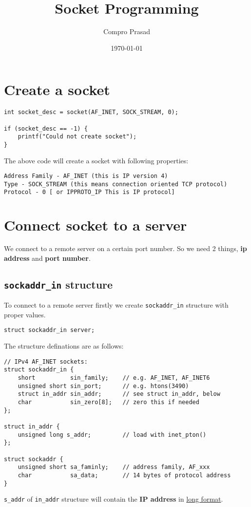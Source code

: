 \documentclass[11pt]{article}
\author{Compro Prasad}
\date{\today}
\title{Socket Programming}
\begin{document}
\maketitle
\tableofcontents

\section{Create a socket}
\label{sec:orgheadline1}
\begin{verbatim}
int socket_desc = socket(AF_INET, SOCK_STREAM, 0);

if (socket_desc == -1) {
	printf("Could not create socket");
}
\end{verbatim}
The above code will create a socket with following properties:
\begin{verbatim}
Address Family - AF_INET (this is IP version 4)
Type - SOCK_STREAM (this means connection oriented TCP protocol)
Protocol - 0 [ or IPPROTO_IP This is IP protocol]
\end{verbatim}
\section{Connect socket to a server}
\label{sec:orgheadline6}
We connect to a remote server on a certain port number. So we need
2 things, \textbf{ip address} and \textbf{port number}.
\subsection{\texttt{sockaddr\_in} structure}
\label{sec:orgheadline2}
To connect to a remote server firstly we create \texttt{sockaddr\_in}
structure with proper values.
\begin{verbatim}
struct sockaddr_in server;
\end{verbatim}
The structure definations are as follows:
\begin{verbatim}
// IPv4 AF_INET sockets:
struct sockaddr_in {
	short          sin_family;    // e.g. AF_INET, AF_INET6
	unsigned short sin_port;      // e.g. htons(3490)
	struct in_addr sin_addr;      // see struct in_addr, below
	char           sin_zero[8];   // zero this if needed
};

struct in_addr {
	unsigned long s_addr;         // load with inet_pton()
};

struct sockaddr {
	unsigned short sa_faminly;    // address family, AF_xxx
	char           sa_data;       // 14 bytes of protocol address
}
\end{verbatim}
\texttt{s\_addr} of \texttt{in\_addr} structure will contain the \textbf{IP address} in \uline{long format}.
\end{document}
